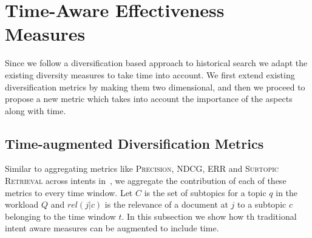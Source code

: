 \section{Time-Aware Effectiveness Measures} 
\label{sec:measures}
 
 Since we follow a diversification based approach to historical search we adapt the existing diversity measures to take time into account. We first extend existing diversification metrics by making them two dimensional, and then we proceed to propose a new metric which takes into account the importance of the aspects along with time.



\subsection{Time-augmented Diversification Metrics} %
\label{sub:diversification_metrics}

Similar to aggregating metrics like \textsc{Precision, NDCG, ERR} and \textsc{Subtopic Retrieval} across intents in~\cite{santos_intent-aware_2011}, we aggregate the contribution of each of these metrics to every time window. Let $C$ is the set of subtopics for a topic $q$ in the workload $Q$ and $rel(j|c)$ is the relevance of a document at $j$ to a subtopic $c$ belonging to the time window $t$. In this subsection we show how th traditional intent aware measures can be augmented to include time.




